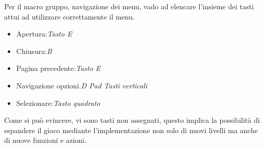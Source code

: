 \documentclass[
a4paper,
cleardoublepage=empty,
headings=twolinechapter,
numbers=autoenddot,
]{scrbook}
\begin{document}
     Per il macro gruppo, navigazione dei menu, vado ad elencare l'insieme dei tasti attui ad utilizzare correttamente il menu.
      \begin{itemize}
     	\item Apertura:\textit{Tasto E}
     	\item Chiusura:\textit{B}
     	\item Pagina precedente:\textit{Tasto E}
     	\item Navigazione opzioni.\textit{D Pad Tasti verticali}
     	\item Selezionare:\textit{Tasto quadrato}
     \end{itemize}
     Come si può evincere, vi sono tasti non assegnati, questo implica la possibilità di espandere il gioco mediante l'implementazione non solo di nuovi livelli ma anche di nuove funzioni e azioni.
\end{document}
